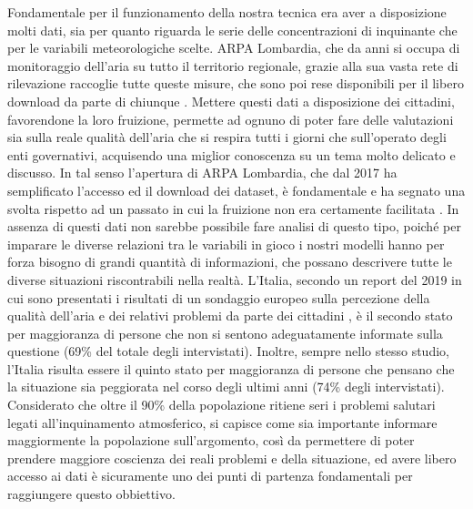 \documentclass[a4paper]{report}
\begin{document}
Fondamentale per il funzionamento della nostra tecnica era aver a disposizione molti dati, sia per quanto riguarda le serie delle concentrazioni di inquinante che per le variabili meteorologiche scelte. ARPA Lombardia, che da anni si occupa di monitoraggio dell'aria su tutto il territorio regionale, grazie alla sua vasta rete di rilevazione raccoglie tutte queste misure, che sono poi rese disponibili per il libero download
da parte di chiunque \cite{arpa_aria, arpa_meteo}. Mettere questi dati a disposizione dei cittadini, favorendone la loro fruizione, permette ad ognuno di poter fare delle valutazioni sia sulla reale qualità dell'aria che si respira tutti i giorni che sull'operato degli enti governativi, acquisendo una miglior conoscenza su un tema molto delicato e discusso. In tal senso l'apertura di ARPA Lombardia, che dal 2017 ha semplificato l'accesso ed il download dei dataset, è fondamentale e ha segnato una svolta rispetto ad un passato in cui la fruizione non era certamente facilitata \cite{trentini2014lombardy}. 
In assenza di questi dati non sarebbe possibile fare analisi di questo tipo, poiché per imparare le diverse relazioni tra le variabili in gioco i nostri modelli hanno per forza bisogno di grandi quantità di informazioni, che possano descrivere tutte le diverse situazioni riscontrabili nella realtà.  
L'Italia, secondo un report del 2019 in cui sono presentati i risultati di un sondaggio europeo sulla percezione della qualità dell'aria e dei relativi problemi da parte dei cittadini \cite{attitudes2019}, è il secondo stato per maggioranza di persone che non si sentono adeguatamente informate sulla questione (69\% del totale degli intervistati). Inoltre, sempre nello stesso studio, l'Italia risulta essere il quinto stato per maggioranza di persone che pensano che la situazione sia peggiorata nel corso degli ultimi anni (74\% degli intervistati). Considerato che oltre il 90\% della popolazione ritiene seri i problemi salutari legati all'inquinamento atmosferico, si capisce come sia importante informare maggiormente la popolazione sull'argomento, così da permettere di poter prendere maggiore coscienza dei reali problemi e della situazione, ed avere libero accesso ai dati è sicuramente uno dei punti di partenza fondamentali per raggiungere questo obbiettivo.
\end{document}
